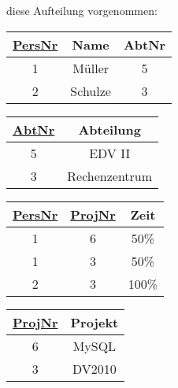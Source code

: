 \documentclass[9pt,a4paper]{arbeitsblatt}
\begin{document}
diese Aufteilung vorgenommen:

\begin{multicols}{2}
\begin{center}
\begin{tabular}{|c|c|c|}\hline
	\rowcolor{ab.tabelle.kopf.hg} \underline{PersNr} & Name & AbtNr \\\hline
	1 & Müller & 5 \\\hline
	2 & Schulze & 3 \\\hline
\end{tabular}
\end{center}

\begin{center}
\begin{tabular}{|c|c|}\hline
	\rowcolor{ab.tabelle.kopf.hg} \underline{AbtNr} & Abteilung \\\hline
	5 & EDV II \\\hline
	3 & Rechenzentrum \\\hline
\end{tabular}
\end{center}

\begin{center}
\begin{tabular}{|c|c|c|}\hline
	\rowcolor{ab.tabelle.kopf.hg} \underline{PersNr} & \underline{ProjNr} & Zeit \\\hline
	1 & 6 & 50\% \\\hline
	1 & 3 & 50\% \\\hline
	2 & 3 & 100\% \\\hline
\end{tabular}
\end{center}

\begin{center}
\begin{tabular}{|c|c|}\hline
	\rowcolor{ab.tabelle.kopf.hg} \underline{ProjNr} & Projekt \\\hline
	6 & MySQL \\\hline
	3 & DV2010 \\\hline
\end{tabular}
\end{center}
\end{multicols}
\end{document}
